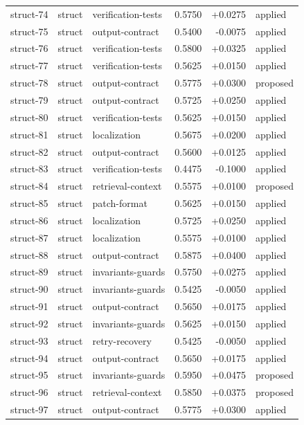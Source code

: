 \begin{center}
\begin{longtable}{llp{5.2cm}rrl}
struct-74 & struct & verification-tests & 0.5750 & +0.0275 & applied \\
struct-75 & struct & output-contract & 0.5400 & -0.0075 & applied \\
struct-76 & struct & verification-tests & 0.5800 & +0.0325 & applied \\
struct-77 & struct & verification-tests & 0.5625 & +0.0150 & applied \\
struct-78 & struct & output-contract & 0.5775 & +0.0300 & proposed \\
struct-79 & struct & output-contract & 0.5725 & +0.0250 & applied \\
struct-80 & struct & verification-tests & 0.5625 & +0.0150 & applied \\
struct-81 & struct & localization & 0.5675 & +0.0200 & applied \\
struct-82 & struct & output-contract & 0.5600 & +0.0125 & applied \\
struct-83 & struct & verification-tests & 0.4475 & -0.1000 & applied \\
struct-84 & struct & retrieval-context & 0.5575 & +0.0100 & proposed \\
struct-85 & struct & patch-format & 0.5625 & +0.0150 & applied \\
struct-86 & struct & localization & 0.5725 & +0.0250 & applied \\
struct-87 & struct & localization & 0.5575 & +0.0100 & applied \\
struct-88 & struct & output-contract & 0.5875 & +0.0400 & applied \\
struct-89 & struct & invariants-guards & 0.5750 & +0.0275 & applied \\
struct-90 & struct & invariants-guards & 0.5425 & -0.0050 & applied \\
struct-91 & struct & output-contract & 0.5650 & +0.0175 & applied \\
struct-92 & struct & invariants-guards & 0.5625 & +0.0150 & applied \\
struct-93 & struct & retry-recovery & 0.5425 & -0.0050 & applied \\
struct-94 & struct & output-contract & 0.5650 & +0.0175 & applied \\
struct-95 & struct & invariants-guards & 0.5950 & +0.0475 & proposed \\
struct-96 & struct & retrieval-context & 0.5850 & +0.0375 & proposed \\
struct-97 & struct & output-contract & 0.5775 & +0.0300 & applied \\

\end{longtable}
\end{center}
